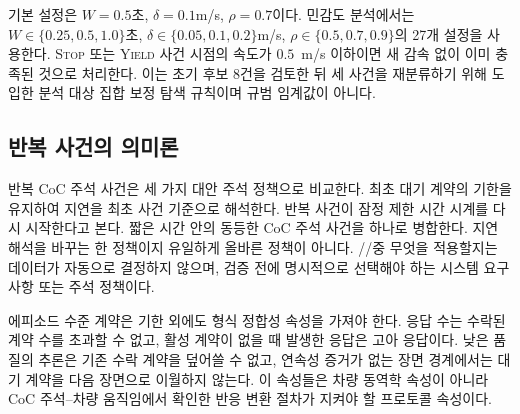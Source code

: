 기본 설정은 $W=0.5$초, $\delta=0.1$m/s, $\rho=0.7$이다. 민감도 분석에서는 $W\in\{0.25,0.5,1.0\}$초, $\delta\in\{0.05,0.1,0.2\}$m/s, $\rho\in\{0.5,0.7,0.9\}$의 27개 설정을 사용한다. \textsc{Stop} 또는 \textsc{Yield} 사건 시점의 속도가 $0.5$~m/s 이하이면 새 감속 없이 이미 충족된 것으로 처리한다. 이는 초기 후보 8건을 검토한 뒤 세 사건을 재분류하기 위해 도입한 분석 대상 집합 보정 탐색 규칙이며 규범 임계값이 아니다.

\subsection{반복 사건의 의미론}
반복 CoC 주석 사건은 세 가지 대안 주석 정책으로 비교한다.  최초 대기 계약의 기한을 유지하여 지연을 최초 사건 기준으로 해석한다.  반복 사건이 잠정 제한 시간 시계를 다시 시작한다고 본다.  짧은 시간 안의 동등한 CoC 주석 사건을 하나로 병합한다.  지연 해석을 바꾸는 한 정책이지 유일하게 올바른 정책이 아니다. \preserve/\reset/\dedup 중 무엇을 적용할지는 데이터가 자동으로 결정하지 않으며, 검증 전에 명시적으로 선택해야 하는 시스템 요구사항 또는 주석 정책이다.

에피소드 수준 계약은 기한 외에도 형식 정합성 속성을 가져야 한다. 응답 수는 수락된 계약 수를 초과할 수 없고, 활성 계약이 없을 때 발생한 응답은 고아 응답이다. 낮은 품질의 추론은 기존 수락 계약을 덮어쓸 수 없고, 연속성 증거가 없는 장면 경계에서는 대기 계약을 다음 장면으로 이월하지 않는다. 이 속성들은 차량 동역학 속성이 아니라 CoC 주석--차량 움직임에서 확인한 반응 변환 절차가 지켜야 할 프로토콜 속성이다.
